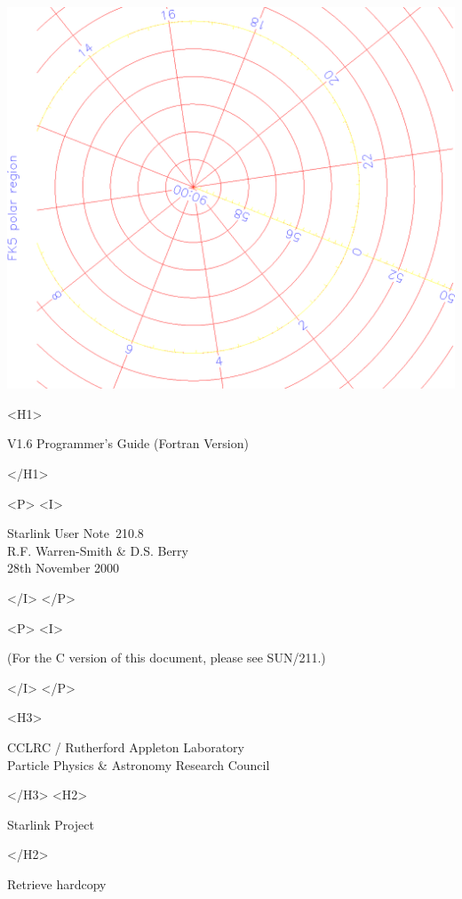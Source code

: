 \documentclass[twoside,11pt]{article}
\newcommand{\stardoccategory}  {Starlink User Note}
\newcommand{\stardocsource}    {sun\stardocnumber}
\newcommand{\stardocnumber}    {210.8}
\newcommand{\stardocauthors}   {R.F. Warren-Smith \& D.S. Berry}
\newcommand{\stardocdate}      {28th November 2000}
\newcommand{\stardocversion}   {V1.6}
\newcommand{\stardocmanualhtml}{Programmer's Guide (Fortran Version)}
\newcommand{\htmladdnormallink}[2]{#1}
\newcommand{\htmladdimg}[1]{}
\newcommand{\xref}[3]{#1}
\begin{document}
\begin{htmlonly}
   \includegraphics[scale=0.3,angle=-90]{sun210_figures/frontc.eps}

   \begin{rawhtml} <H1> \end{rawhtml}
      \stardocversion
      \stardocmanualhtml
   \begin{rawhtml} </H1> \end{rawhtml}
   \begin{rawhtml} <P> <I> \end{rawhtml}
   \stardoccategory\ \stardocnumber \\
   \stardocauthors \\
   \stardocdate
   \begin{rawhtml} </I> </P> \end{rawhtml}
   \begin{rawhtml} <P> <I> \end{rawhtml}
   (For the C version of this document, please see \xref{SUN/211}{sun211}{}.)
   \begin{rawhtml} </I> </P> \end{rawhtml}
   \begin{rawhtml} <H3> \end{rawhtml}
      \htmladdnormallink{CCLRC}{http://www.cclrc.ac.uk} /
      \htmladdnormallink{Rutherford Appleton Laboratory}
                        {http://www.cclrc.ac.uk/ral} \\
      \htmladdnormallink{Particle Physics \& Astronomy Research Council}
                        {http://www.pparc.ac.uk} \\
   \begin{rawhtml} </H3> <H2> \end{rawhtml}
      \htmladdnormallink{Starlink Project}{http://www.starlink.rl.ac.uk/}
   \begin{rawhtml} </H2> \end{rawhtml}
   \htmladdnormallink{\htmladdimg{source.gif} Retrieve hardcopy}
      {http://www.starlink.rl.ac.uk/cgi-bin/hcserver?\stardocsource}\\


\end{htmlonly}
\end{document}
